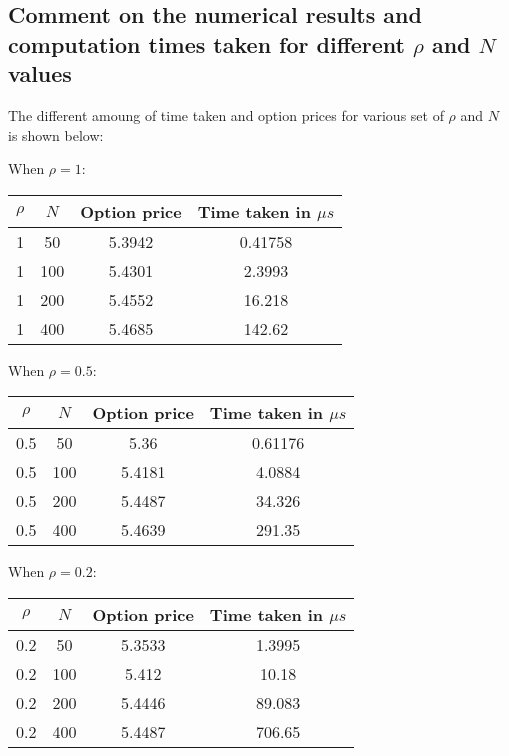 \subsection{Comment on the numerical results and computation times taken for different $\rho$ and $N$ values}
The different amoung of time taken and option prices for various set of $\rho$ and $N$ is shown below:

\hspace{23mm} When $\rho=1$:
\begin{center}
	\begin{tabular}{| c | c | c | c |}
		\hline $\rho$ & $N$ & Option price & Time taken in $\mu s$\\
		[0.5ex]
		\hline 1 & 50 & 5.3942 & 0.41758 \\
		\hline 1 & 100 & 5.4301 & 2.3993 \\
		\hline 1 & 200 & 5.4552 & 16.218 \\
		\hline 1 & 400 & 5.4685 & 142.62 \\
		\hline
	\end{tabular}
\end{center}

\hspace{23mm} When $\rho=0.5$:
\begin{center}
	\begin{tabular}{| c | c | c | c |}
		\hline $\rho$ & $N$ & Option price & Time taken in $\mu s$\\
		[0.5ex]
		\hline 0.5 & 50 & 5.36 & 0.61176 \\
		\hline 0.5 & 100 & 5.4181 & 4.0884 \\
		\hline 0.5 & 200 & 5.4487 & 34.326 \\
		\hline 0.5 & 400 & 5.4639 & 291.35 \\
		\hline
	\end{tabular}
\end{center}

\hspace{23mm} When $\rho=0.2$:
\begin{center}
	\begin{tabular}{| c | c | c | c |}
		\hline $\rho$ & $N$ & Option price & Time taken in $\mu s$\\
		[0.5ex]
		\hline 0.2 & 50 & 5.3533 & 1.3995 \\
		\hline 0.2 & 100 & 5.412 & 10.18 \\
		\hline 0.2 & 200 & 5.4446 & 89.083 \\
		\hline 0.2 & 400 & 5.4487 & 706.65 \\
		\hline
	\end{tabular}
\end{center}

